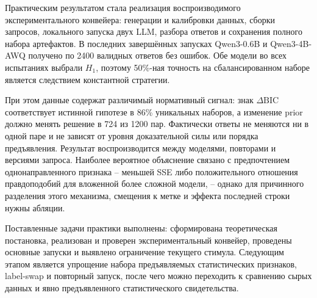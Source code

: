 \documentclass[a4paper,14pt]{extarticle}
\newcommand{\Hone}{\ensuremath{H_1}}
\newcommand{\DeltaBIC}{\ensuremath{\Delta\mathrm{BIC}}}
\begin{document}
Практическим результатом стала реализация воспроизводимого экспериментального конвейера: генерации и калибровки данных, сборки запросов, локального запуска двух LLM, разбора ответов и сохранения полного набора артефактов. В последних завершённых запусках Qwen3-0.6B и Qwen3-4B-AWQ получено по 2400 валидных ответов без ошибок. Обе модели во всех испытаниях выбрали \Hone, поэтому 50\%-ная точность на сбалансированном наборе является следствием константной стратегии.

При этом данные содержат различимый нормативный сигнал: знак \DeltaBIC{} соответствует истинной гипотезе в 86\% уникальных наборов, а изменение prior должно менять решение в 724 из 1200 пар. Фактически ответы не меняются ни в одной паре и не зависят от уровня доказательной силы или порядка предъявления. Результат воспроизводится между моделями, повторами и версиями запроса. Наиболее вероятное объяснение связано с предпочтением однонаправленного признака -- меньшей SSE либо положительного отношения правдоподобий для вложенной более сложной модели, -- однако для причинного разделения этого механизма, смещения к метке и эффекта последней строки нужны абляции.

Поставленные задачи практики выполнены: сформирована теоретическая постановка, реализован и проверен экспериментальный конвейер, проведены основные запуски и выявлено ограничение текущего стимула. Следующим этапом является упрощение набора предъявляемых статистических признаков, label-swap и повторный запуск, после чего можно переходить к сравнению сырых данных и явно предъявленного статистического свидетельства.
\end{document}
